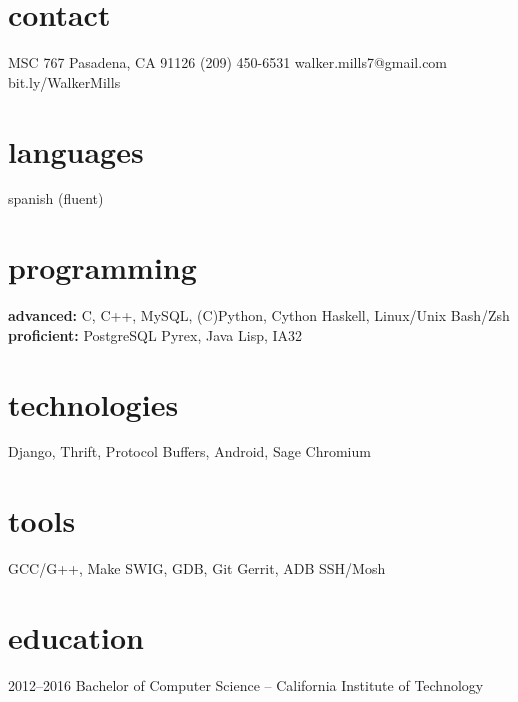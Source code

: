 \documentclass[]{mills-cv} %
\begin{document}


\begin{aside} %
\section{contact}
MSC 767
Pasadena, CA 91126
(209) 450-6531
\small walker.mills7@gmail.com
bit.ly/WalkerMills
\section{languages}
spanish (fluent)
\section{programming}
\textbf{advanced:}
C, C++, MySQL,
(C)Python, Cython
Haskell, Linux/Unix
Bash/Zsh
\textbf{proficient:}
PostgreSQL
Pyrex, Java
Lisp, IA32
\section{technologies}
Django, Thrift,
Protocol Buffers,
Android, Sage
Chromium
\section{tools}
GCC/G++, Make
SWIG, GDB, Git
Gerrit, ADB
SSH/Mosh
\end{aside}


\section{education}

\begin{entrylist}
\entry
{2012--2016}
{Bachelor of Computer Science \normalfont -- California Institute of Technology}{}{}
\end{entrylist}
\end{document}
